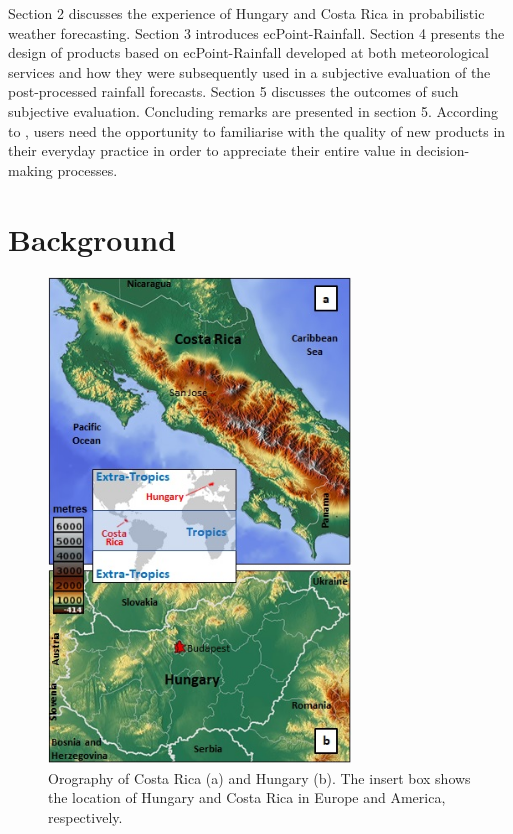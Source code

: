 \documentclass[twocol]{ametsocV5} %
\begin{document}
Section 2 discusses the experience of Hungary and Costa Rica in probabilistic weather forecasting. Section 3  introduces ecPoint-Rainfall. Section 4 presents the design of products based on ecPoint-Rainfall developed at both meteorological services and how they were subsequently used in a subjective evaluation of the post-processed rainfall forecasts. Section 5 discusses the outcomes of such subjective evaluation. Concluding remarks are presented in section 5.
According to \citet{Fundel2019}, users need the opportunity to familiarise with the quality of new products in their everyday practice in order to appreciate their entire value in decision-making processes.

\section{Background}

\begin{figure}
\centerline{\includegraphics[width=19pc]{manuscript/Figures/Fig1.jpg}}
\caption{Orography of Costa Rica (a) and Hungary (b). The insert box shows the location of Hungary and Costa Rica in Europe and America, respectively.}
\label{Fig1}
\end{figure}
\end{document}
